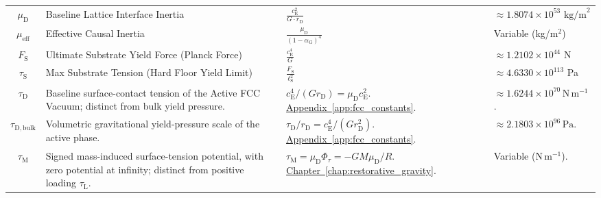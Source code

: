 \begin{longtable}{@{} c p{5.5cm} p{4cm} p{3.5cm} @{}}
$\mu_{\mathrm{D}}$ & Baseline Lattice Interface Inertia & $\frac{c_{\mathrm{E}}^2}{G \cdot r_{\mathrm{D}}}$ & $\approx 1.8074 \times 10^{53} \text{ kg/m}^2$ \\

$\mu_{\mathrm{eff}}$ & Effective Causal Inertia & $\frac{\mu_{\mathrm{D}}}{(1 - \alpha_{\mathrm{G}})^4}$ & Variable (kg/m$^2$) \\

$F_{\mathrm{S}}$ & Ultimate Substrate Yield Force (Planck Force) & $\frac{c_{\mathrm{E}}^4}{G}$ & $\approx 1.2102 \times 10^{44}$ N \\

$\tau_{\mathrm{S}}$ & Max Substrate Tension (Hard Floor Yield Limit) & $\frac{F_{\mathrm{S}}}{\ell_{\mathrm{S}}^2}$ & $\approx 4.6330 \times 10^{113}$ Pa \\

$\tau_{\mathrm D}$ & {\raggedright Baseline surface-contact tension of the Active FCC Vacuum; distinct from bulk yield pressure.\par} & {\raggedright $c_{\mathrm E}^4/(G r_{\mathrm D})=\mu_{\mathrm D}c_{\mathrm E}^2$. \newline \hyperref[app:fcc_constants]{Appendix~\ref*{app:fcc_constants}}.\par} & {\raggedright $\approx1.6244\times10^{70}\,\mathrm{N\,m^{-1}}$.\par} \\

$\tau_{\mathrm{D,bulk}}$ & {\raggedright Volumetric gravitational yield-pressure scale of the active phase.\par} & {\raggedright $\tau_{\mathrm D}/r_{\mathrm D}=c_{\mathrm E}^4/(G r_{\mathrm D}^2)$. \newline \hyperref[app:fcc_constants]{Appendix~\ref*{app:fcc_constants}}.\par} & {\raggedright $\approx2.1803\times10^{96}\,\mathrm{Pa}$.\par} \\


$\tau_{\mathrm M}$ & {\raggedright Signed mass-induced surface-tension potential, with zero potential at infinity; distinct from positive loading $\tau_{\mathrm L}$.\par} & {\raggedright $\tau_{\mathrm M}=\mu_{\mathrm D}\Phi_\tau=-GM\mu_{\mathrm D}/R$. \newline \hyperref[chap:restorative_gravity]{Chapter~\ref*{chap:restorative_gravity}}.\par} & {\raggedright Variable ($\mathrm{N\,m^{-1}}$).\par} \\


\end{longtable}
